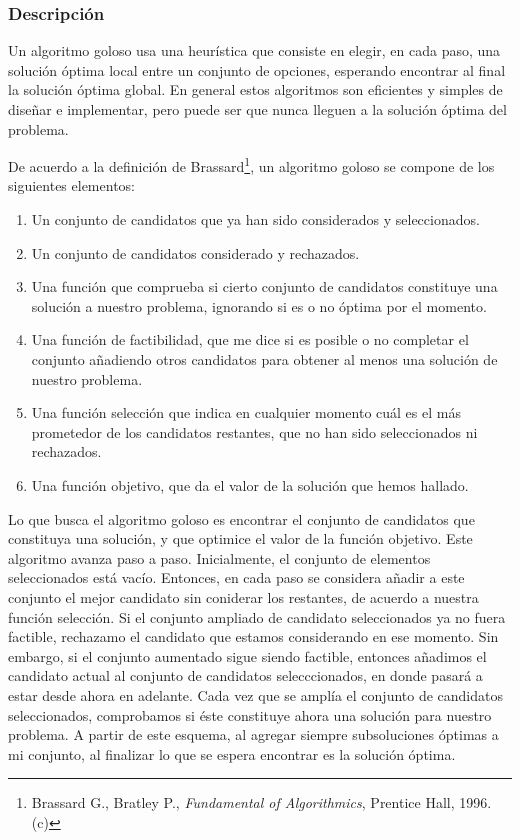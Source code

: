 \subsubsection{Descripción}

Un algoritmo goloso usa una heur\'istica que consiste en elegir, en cada paso, una soluci\'on \'optima local entre un conjunto de opciones, esperando encontrar al final la soluci\'on \'optima global. En general estos algoritmos son eficientes y simples de dise\~nar e implementar, pero puede ser que nunca lleguen a la soluci\'on \'optima del problema. 

De acuerdo a la definici\'on de Brassard\footnote{\label{Brassard}Brassard G., Bratley P., {\it Fundamental of Algorithmics}, Prentice Hall, 1996. (c)}, un algoritmo goloso se compone de los siguientes elementos: 

\begin{enumerate}
 \item Un conjunto de candidatos que ya han sido considerados y seleccionados. 
 \item Un conjunto de candidatos considerado y rechazados. 
 \item Una funci\'on que comprueba si cierto conjunto de candidatos constituye una soluci\'on a nuestro problema, ignorando si es o no \'optima por el momento. 
 \item Una funci\'on de factibilidad, que me dice si es posible o no completar el conjunto a\~nadiendo otros candidatos para obtener al menos una soluci\'on de nuestro problema. 
 \item Una funci\'on selecci\'on que indica en cualquier momento cu\'al es el m\'as prometedor de los candidatos restantes, que no han sido seleccionados ni rechazados. 
 \item Una funci\'on objetivo, que da el valor de la soluci\'on que hemos hallado. 
\end{enumerate}

Lo que busca el algoritmo goloso es encontrar el conjunto de candidatos que constituya una soluci\'on, y que optimice el valor de la funci\'on objetivo. Este algoritmo avanza paso a paso. Inicialmente, el conjunto de elementos seleccionados est\'a vac\'io. Entonces, en cada paso se considera a\~nadir a este conjunto el mejor candidato sin coniderar los restantes, de acuerdo a nuestra funci\'on selecci\'on. Si el conjunto ampliado de candidato seleccionados ya no fuera factible, rechazamo el candidato que estamos considerando en ese momento. Sin embargo, si el conjunto aumentado sigue siendo factible, entonces a\~nadimos el candidato actual al conjunto de candidatos selecccionados, en donde pasar\'a a estar desde ahora en adelante. Cada vez que se ampl\'ia el conjunto de candidatos seleccionados, comprobamos si \'este constituye ahora una soluci\'on para nuestro problema. A partir de este esquema, al agregar siempre subsoluciones \'optimas a mi conjunto, al finalizar lo que se espera encontrar es la soluci\'
on \'optima. 

